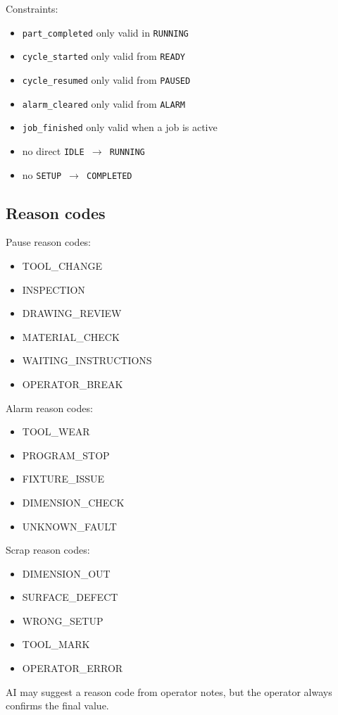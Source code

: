 \documentclass[11pt]{article}
\begin{document}
Constraints:
\begin{itemize}
\item \texttt{part\_completed} only valid in \texttt{RUNNING}
\item \texttt{cycle\_started} only valid from \texttt{READY}
\item \texttt{cycle\_resumed} only valid from \texttt{PAUSED}
\item \texttt{alarm\_cleared} only valid from \texttt{ALARM}
\item \texttt{job\_finished} only valid when a job is active
\item no direct \texttt{IDLE $\rightarrow$ RUNNING}
\item no \texttt{SETUP $\rightarrow$ COMPLETED}
\end{itemize}

\subsection{Reason codes}
Pause reason codes:
\begin{itemize}
\item TOOL\_CHANGE
\item INSPECTION
\item DRAWING\_REVIEW
\item MATERIAL\_CHECK
\item WAITING\_INSTRUCTIONS
\item OPERATOR\_BREAK
\end{itemize}

Alarm reason codes:
\begin{itemize}
\item TOOL\_WEAR
\item PROGRAM\_STOP
\item FIXTURE\_ISSUE
\item DIMENSION\_CHECK
\item UNKNOWN\_FAULT
\end{itemize}

Scrap reason codes:
\begin{itemize}
\item DIMENSION\_OUT
\item SURFACE\_DEFECT
\item WRONG\_SETUP
\item TOOL\_MARK
\item OPERATOR\_ERROR
\end{itemize}

AI may suggest a reason code from operator notes, but the operator always confirms the final value.
\end{document}
